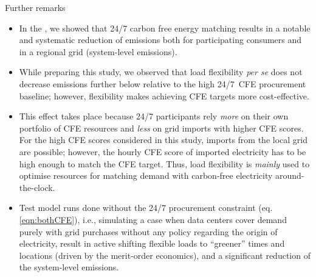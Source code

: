 \begin{frame}{Further remarks}

  {\footnotesize 

  \begin{itemize}

  \item  In the , we showed that 24/7 carbon free energy matching results in a \alert{notable and systematic reduction of emissions} both for participating consumers and in a regional grid (system-level emissions). 
  
  \item While preparing this study, we observed that load flexibility \textit{per se} does not decrease emissions further below relative to the high 24/7~CFE procurement baseline; however, flexibility makes achieving CFE targets \alert{more cost-effective}.

  \item This effect takes place because 24/7 participants rely \textit{more} on their own portfolio of CFE resources and \textit{less} on grid imports with higher CFE scores.
  For the high CFE scores considered in this study, imports from the local grid are possible; however, the hourly CFE score of imported electricity has to be high enough to match the CFE target. 
  Thus, load flexibility is \textit{mainly} used to optimise resources for matching demand with carbon-free electricity around-the-clock. 

  \item Test model runs done without the 24/7 procurement constraint (eq. \ref{eqn:bothCFE}), i.e., simulating a case when data centers cover demand purely with grid purchases without any policy regarding the origin of electricity, result in active shifting flexible loads to \enquote{greener} times and locations (driven by the merit-order economics), and a significant reduction of the system-level emissions.

  \end{itemize}
  }
\end{frame}



